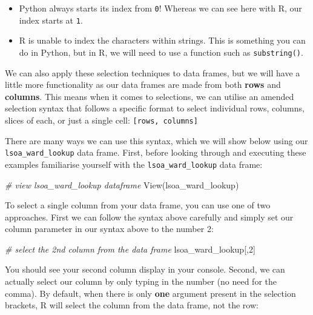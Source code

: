 \documentclass[
]{book}
\newenvironment{Shaded}{\begin{snugshade}}{\end{snugshade}}
\newcommand{\CommentTok}[1]{\textcolor[rgb]{0.56,0.35,0.01}{\textit{#1}}}
\newcommand{\DecValTok}[1]{\textcolor[rgb]{0.00,0.00,0.81}{#1}}
\newcommand{\FunctionTok}[1]{\textcolor[rgb]{0.00,0.00,0.00}{#1}}
\newcommand{\NormalTok}[1]{#1}
\providecommand{\tightlist}{%
  \setlength{\itemsep}{0pt}\setlength{\parskip}{0pt}}
\begin{document}
\begin{itemize}
\tightlist
\item
  Python always starts its index from \texttt{0}! Whereas we can see here with R, our index starts at \texttt{1}.
\item
  R is unable to index the characters within strings. This is something you can do in Python, but in R, we will need to use a function such as \texttt{substring()}.
\end{itemize}

We can also apply these selection techniques to data frames, but we will have a little more functionality as our data frames are made from both \textbf{rows} and \textbf{columns}. This means when it comes to selections, we can utilise an amended selection syntax that follows a specific format to select individual rows, columns, slices of each, or just a single cell: \texttt{{[}rows,\ columns{]}}

There are many ways we can use this syntax, which we will show below using our \texttt{lsoa\_ward\_lookup} data frame. First, before looking through and executing these examples familiarise yourself with the \texttt{lsoa\_ward\_lookup} data frame:

\begin{Shaded}
\begin{Highlighting}[]
\CommentTok{\# view lsoa\_ward\_lookup dataframe}
\FunctionTok{View}\NormalTok{(lsoa\_ward\_lookup)}
\end{Highlighting}
\end{Shaded}

To select a single column from your data frame, you can use one of two approaches. First we can follow the syntax above carefully and simply set our column parameter in our syntax above to the number 2:

\begin{Shaded}
\begin{Highlighting}[]
\CommentTok{\# select the 2nd column from the data frame}
\NormalTok{lsoa\_ward\_lookup[,}\DecValTok{2}\NormalTok{]}
\end{Highlighting}
\end{Shaded}

You should see your second column display in your console. Second, we can actually select our column by only typing in the number (no need for the comma). By default, when there is only \textbf{one} argument present in the selection brackets, R will select the column from the data frame, not the row:
\end{document}
